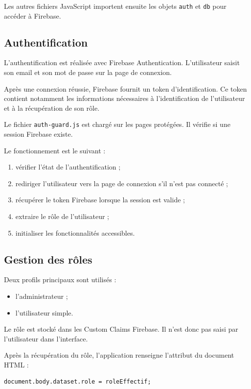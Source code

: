 \documentclass{rapportENSIAS}
\begin{document}
Les autres fichiers JavaScript importent ensuite les objets \texttt{auth} et \texttt{db} pour accéder à Firebase.

\subsection{Authentification}

L’authentification est réalisée avec Firebase Authentication. L’utilisateur saisit son email et son mot de passe sur la page de connexion.

Après une connexion réussie, Firebase fournit un token d’identification. Ce token contient notamment les informations nécessaires à l’identification de l’utilisateur et à la récupération de son rôle.

Le fichier \texttt{auth-guard.js} est chargé sur les pages protégées. Il vérifie si une session Firebase existe.

Le fonctionnement est le suivant :

\begin{enumerate}
    \item vérifier l’état de l’authentification ;
    \item rediriger l’utilisateur vers la page de connexion s’il n’est pas connecté ;
    \item récupérer le token Firebase lorsque la session est valide ;
    \item extraire le rôle de l’utilisateur ;
    \item initialiser les fonctionnalités accessibles.
\end{enumerate}

\subsection{Gestion des rôles}

Deux profils principaux sont utilisés :

\begin{itemize}
    \item l’administrateur ;
    \item l’utilisateur simple.
\end{itemize}

Le rôle est stocké dans les Custom Claims Firebase. Il n’est donc pas saisi par l’utilisateur dans l’interface.

Après la récupération du rôle, l’application renseigne l’attribut du document HTML :

\begin{verbatim}
document.body.dataset.role = roleEffectif;
\end{verbatim}
\end{document}
